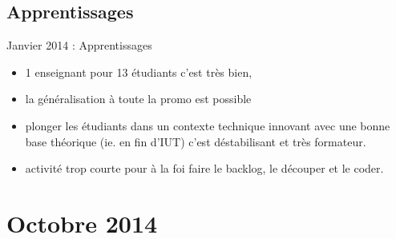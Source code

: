 \documentclass{beamer}
\begin{document}
\subsection{Apprentissages}
\begin{frame}{Janvier 2014 : Apprentissages}
  \begin{itemize}
    \item 1 enseignant pour 13 étudiants c'est très bien,
    \item la généralisation à toute la promo est possible
    \item plonger les étudiants dans un contexte technique innovant avec une bonne base théorique (ie. en fin d'IUT) c'est déstabilisant et très formateur. 
    \item activité trop courte pour à la foi faire le backlog, le découper et le coder.
  \end{itemize}
\end{frame}


\section{Octobre 2014}
\end{document}
